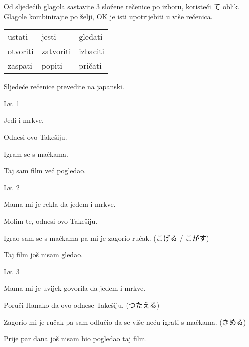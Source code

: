 
\author{Tomislav Mamić}

	
	\noindent Od sljedećih glagola sastavite 3 složene rečenice po izboru, koristeći て oblik. Glagole kombinirajte po želji, OK je isti upotrijebiti u više rečenica.
	
	\vspace{5pt}
	\begin{tabular}{l l l}
		ustati & jesti & gledati \\
		otvoriti & zatvoriti & izbaciti \\
		zaspati & popiti & pričati \\
	\end{tabular}

	\vspace{15pt}
	\noindent Sljedeće rečenice prevedite na japanski.

	\begin{mondai}{Lv. 1}
		\item Jedi i mrkve.
		\item Odnesi ovo Takešiju.
		\item Igram se s mačkama.
		\item Taj sam film već pogledao.
	\end{mondai}

	\begin{mondai}{Lv. 2}
		\item Mama mi je rekla da jedem i mrkve.
		\item Molim te, odnesi ovo Takešiju.
		\item Igrao sam se s mačkama pa mi je zagorio ručak. (こげる / こがす)
		\item Taj film još nisam gledao.
	\end{mondai}

	\begin{mondai}{Lv. 3}
		\item Mama mi je uvijek govorila da jedem i mrkve.
		\item Poruči Hanako da ovo odnese Takešiju. (つたえる)
		\item Zagorio mi je ručak pa sam odlučio da se više neću igrati s mačkama. (きめる)
		\item Prije par dana još nisam bio pogledao taj film.
	\end{mondai}
